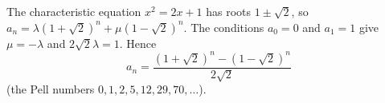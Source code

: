 The characteristic equation $x^2=2x+1$ has roots $1\pm\sqrt2$, so $a_n=\lambda\left(1+\sqrt2\right)^n+\mu\left(1-\sqrt2\right)^n$. The conditions $a_0=0$ and $a_1=1$ give $\mu=-\lambda$ and $2\sqrt2\lambda=1$. Hence
\[\boxed{a_n=\dfrac{\left(1+\sqrt2\right)^n-\left(1-\sqrt2\right)^n}{2\sqrt2}}\]
(the Pell numbers $0,1,2,5,12,29,70,\dots$).
